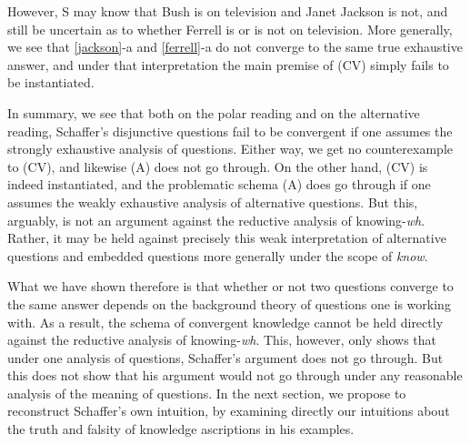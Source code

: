 However, S may know that Bush is on television and Janet Jackson
is not, and still be uncertain as to whether Ferrell is or is not
on television. More generally, we see that \ref{jackson}-a and
\ref{ferrell}-a do not converge to the same true exhaustive
answer, and under that interpretation the main premise of (CV)
simply fails to be instantiated.

In summary, we see that both on the polar reading and on the
alternative reading, Schaffer's disjunctive questions fail to be
convergent if one assumes the strongly exhaustive analysis of
questions. Either way, we get no counterexample to (CV), and
likewise (A) does not go through. On the other hand, (CV) is
indeed instantiated, and the problematic schema (A) does go
through if one assumes the weakly exhaustive analysis of
alternative questions. But this, arguably, is not an argument
against the reductive analysis of knowing-\emph{wh}. Rather, it
may be held against precisely this weak interpretation of
alternative questions and embedded questions more generally under
the scope of \emph{know}.

What we have shown therefore is that whether or not two questions
converge to the same answer depends on the background theory of
questions one is working with. As a result, the schema of
convergent knowledge cannot be held directly against the reductive
analysis of knowing-\emph{wh}. This, however, only shows that
under one analysis of questions, Schaffer's argument does not go
through. But this does not show that his argument would not go
through under any reasonable analysis of the meaning of questions.
In the next section, we propose to reconstruct Schaffer's own
intuition, by examining directly our intuitions about the truth
and falsity of knowledge ascriptions in his examples.
